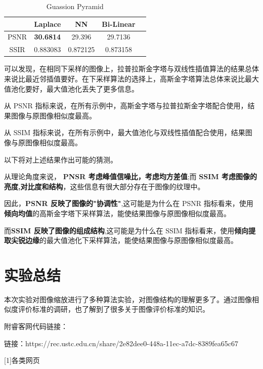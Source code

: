 \documentclass[12pt]{article}
\begin{document}
	\begin{table}[H]
		\centering
		\begin{tabular}{|c|c|c|c|c|}
			\hline
			& Laplace  & NN       & Bi-Linear   \\ \hline
			PSNR & \textbf{30.6814}  & 29.396   & 29.7136     \\ \hline
			SSIR & 0.883083 & 0.872125 & 0.873158    \\ \hline
		\end{tabular}
	\caption{Guassion Pyramid}
	\label{}
	\end{table}
	
	可以发现，在相同下采样的图像上，拉普拉斯金字塔与双线性插值算法的结果总体来说比最近邻插值要好。在下采样算法的选择上，高斯金字塔算法总体来说比最大值池化要好，最大值池化丢失了更多信息。
	
	从 PSNR 指标来说，在所有示例中，高斯金字塔与拉普拉斯金字塔配合使用，结果图像与原图像相似度最高。
	
	从 SSIM 指标来说，在所有示例中，最大值池化与双线性插值配合使用，结果图像与原图像相似度最高。
	
	以下将对上述结果作出可能的猜测。
	
	从理论角度来说， \textbf{PNSR 考虑峰值信噪比，考虑均方差值};而 \textbf{SSIM 考虑图像的亮度,对比度和结构}，这些信息有很大部分存在于图像的纹理中。
	
	因此，\textbf{PSNR 反映了图像的"协调性"},这可能是为什么在 PSNR 指标看来，使用\textbf{倾向均值}的高斯金字塔下采样算法，能使结果图像与原图像相似度最高。
	
	而\textbf{SSIM 反映了图像的组成结构},这可能是为什么在 SSIM 指标看来，使用\textbf{倾向提取尖锐边缘}的最大值池化下采样算法，能使结果图像与原图像相似度最高。
	
	
	\section{实验总结}
	本次实验对图像缩放进行了多种算法实验，对图像结构的理解更多了。通过图像相似度评价标准的调研，也了解到了很多关于图像评价标准的知识。
	
	附睿客网代码链接：
	
	链接：https://rec.ustc.edu.cn/share/2e82dee0-448a-11ec-a7dc-8389fea65c67
	
	\begin{thebibliography}{99}
	
		[1]各类网页
		
	\end{thebibliography}
\end{document}
